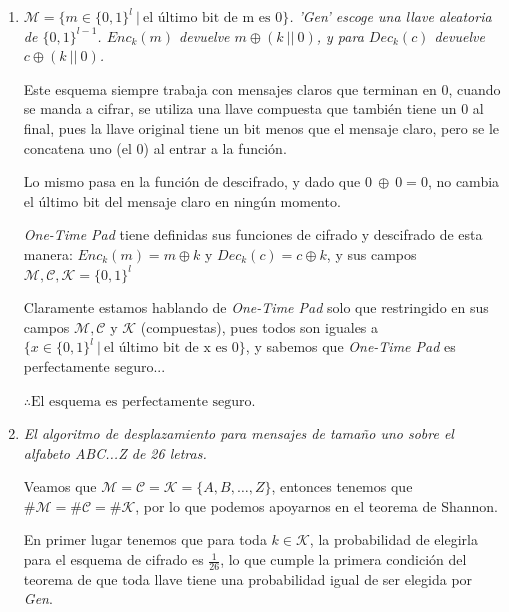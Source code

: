 \documentclass[11pt]{article}
\begin{document}
\begin{enumerate}[label=\alph*)]
            Por lo que: 
            
            $$ \displaystyle Pr(M = m\ |\ C = c) \neq Pr(M = m) $$
            
            $ \therefore \text{El esquema no es perfectamente seguro.} $
            
            \item \textit{$ \mathcal{M} = \{m \in \{0, 1\}^{l}\ |\ \text{el último bit de m es 0}\} $. 'Gen' escoge una llave aleatoria de $ \{0,1\}^{l-1} $. $ Enc_{k}(m) $ devuelve $ m \oplus (k\ ||\ 0) $, y para $ Dec_{k}(c) $ devuelve $ c \oplus (k\ ||\ 0) $.}
            
            Este esquema siempre trabaja con mensajes claros que terminan en $ 0 $, cuando se manda a cifrar, se utiliza una llave compuesta que también tiene un $ 0 $ al final, pues la llave original tiene un bit menos que el mensaje claro, pero se le concatena uno (el $ 0 $) al entrar a la función.
            
            Lo mismo pasa en la función de descifrado, y dado que $ 0\ \oplus\ 0 = 0 $, no cambia el último bit del mensaje claro en ningún momento.
            
            \textit{One-Time Pad} tiene definidas sus funciones de cifrado y descifrado de esta manera: $ Enc_{k}(m) = m \oplus k $ y $ Dec_{k}(c) = c \oplus k $, y sus campos $ \mathcal{M}, \mathcal{C}, \mathcal{K} = \{0,1\}^{l} $
            
            Claramente estamos hablando de \textit{One-Time Pad} solo que restringido en sus campos $ \mathcal{M}, \mathcal{C} $ y $ \mathcal{K} $ (compuestas), pues todos son iguales a $ \{x \in \{0,1\}^{l}\ |\ \text{el último bit de x es 0}\} $, y sabemos que \textit{One-Time Pad} es perfectamente seguro...
            
            $ \therefore \text{El esquema es perfectamente seguro.} $
            
            \item \textit{El algoritmo de desplazamiento para mensajes de tamaño uno sobre el alfabeto ABC...Z de 26 letras.}
            
            Veamos que $ \mathcal{M} = \mathcal{C} = \mathcal{K} = \{A, B, \dots, Z\}$, entonces tenemos que $ \#\mathcal{M} = \#\mathcal{C} = \#\mathcal{K} $, por lo que podemos apoyarnos en el teorema de Shannon.
            
            En primer lugar tenemos que para toda $ k \in \mathcal{K} $, la probabilidad de elegirla para el esquema de cifrado es $ \frac{1}{26} $, lo que cumple la primera condición del teorema de que toda llave tiene una probabilidad igual de ser elegida por \textit{Gen}.
            

\end{enumerate}
\end{document}
